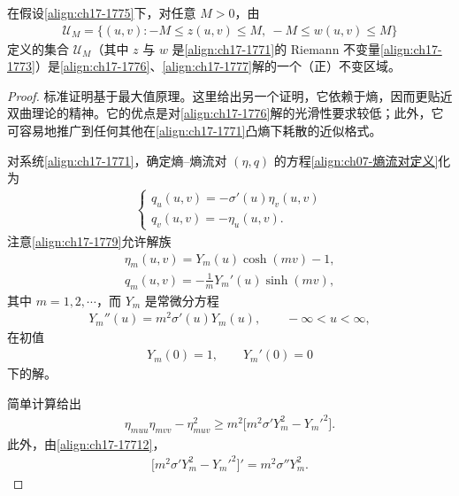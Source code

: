 \documentclass[../../main.tex]{subfiles}
\begin{document}
\begin{theorem}[等熵弹性的不变区域]\label{theorem:ch17-弹性不变区域}
在假设\eqref{align:ch17-1775}下，对任意 $M>0$，由
\begin{align}
\mathscr{U}_M=\{(u,v):-M\leqslant z(u,v)\leqslant M,\ -M\leqslant w(u,v)\leqslant M\}
\label{align:ch17-1778}
\end{align}
定义的集合 $\mathscr{U}_M$（其中 $z$ 与 $w$ 是\eqref{align:ch17-1771}的 Riemann 不变量\eqref{align:ch17-1773}）是\eqref{align:ch17-1776}、\eqref{align:ch17-1777}解的一个（正）不变区域。
\end{theorem}

\begin{proof}
标准证明基于最大值原理。这里给出另一个证明，它依赖于熵，因而更贴近双曲理论的精神。它的优点是对\eqref{align:ch17-1776}解的光滑性要求较低；此外，它可容易地推广到任何其他在\eqref{align:ch17-1771}凸熵下耗散的近似格式。

对系统\eqref{align:ch17-1771}，确定熵--熵流对 $(\eta,q)$ 的方程\eqref{align:ch07-熵流对定义}化为
\begin{align}
\begin{cases}
q_u(u,v)=-\sigma'(u)\eta_v(u,v)\\
q_v(u,v)=-\eta_u(u,v).
\end{cases}
\label{align:ch17-1779}
\end{align}
注意\eqref{align:ch17-1779}允许解族
\begin{align}
\eta_m(u,v)=Y_m(u)\cosh(mv)-1,
\label{align:ch17-17710}
\end{align}
\begin{align}
q_m(u,v)=-\frac{1}{m}Y_m'(u)\sinh(mv),
\label{align:ch17-17711}
\end{align}
其中 $m=1,2,\cdots$，而 $Y_m$ 是常微分方程
\begin{align}
Y_m''(u)=m^2\sigma'(u)Y_m(u),\qquad-\infty<u<\infty,
\label{align:ch17-17712}
\end{align}
在初值
\begin{align}
Y_m(0)=1,\qquad Y_m'(0)=0
\label{align:ch17-17713}
\end{align}
下的解。

简单计算给出
\begin{align}
\eta_{muu}\eta_{mvv}-\eta_{muv}^2\geqslant m^2\bigl[m^2\sigma'Y_m^2-Y_m'^2\bigr].
\label{align:ch17-17714}
\end{align}
此外，由\eqref{align:ch17-17712}，
\begin{align}
\bigl[m^2\sigma'Y_m^2-Y_m'^2\bigr]'=m^2\sigma''Y_m^2.
\label{align:ch17-17715}
\end{align}


\end{proof}
\end{document}
